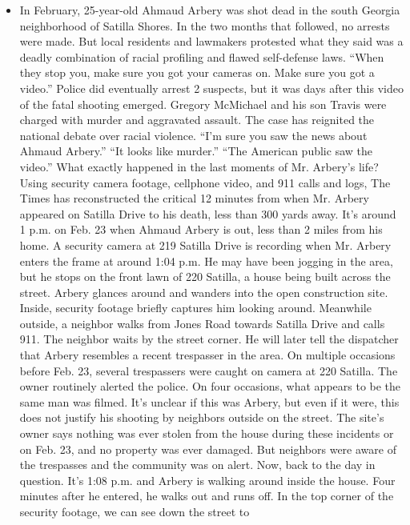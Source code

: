 \begin{itemize}
\tightlist
\item
  In February, 25-year-old Ahmaud Arbery was shot dead in the south
  Georgia neighborhood of Satilla Shores. In the two months that
  followed, no arrests were made. But local residents and lawmakers
  protested what they said was a deadly combination of racial profiling
  and flawed self-defense laws. ``When they stop you, make sure you got
  your cameras on. Make sure you got a video.'' Police did eventually
  arrest 2 suspects, but it was days after this video of the fatal
  shooting emerged. Gregory McMichael and his son Travis were charged
  with murder and aggravated assault. The case has reignited the
  national debate over racial violence. ``I'm sure you saw the news
  about Ahmaud Arbery.'' ``It looks like murder.'' ``The American public
  saw the video.'' What exactly happened in the last moments of Mr.
  Arbery's life? Using security camera footage, cellphone video, and 911
  calls and logs, The Times has reconstructed the critical 12 minutes
  from when Mr. Arbery appeared on Satilla Drive to his death, less than
  300 yards away. It's around 1 p.m. on Feb. 23 when Ahmaud Arbery is
  out, less than 2 miles from his home. A security camera at 219 Satilla
  Drive is recording when Mr. Arbery enters the frame at around 1:04
  p.m. He may have been jogging in the area, but he stops on the front
  lawn of 220 Satilla, a house being built across the street. Arbery
  glances around and wanders into the open construction site. Inside,
  security footage briefly captures him looking around. Meanwhile
  outside, a neighbor walks from Jones Road towards Satilla Drive and
  calls 911. The neighbor waits by the street corner. He will later tell
  the dispatcher that Arbery resembles a recent trespasser in the area.
  On multiple occasions before Feb. 23, several trespassers were caught
  on camera at 220 Satilla. The owner routinely alerted the police. On
  four occasions, what appears to be the same man was filmed. It's
  unclear if this was Arbery, but even if it were, this does not justify
  his shooting by neighbors outside on the street. The site's owner says
  nothing was ever stolen from the house during these incidents or on
  Feb. 23, and no property was ever damaged. But neighbors were aware of
  the trespasses and the community was on alert. Now, back to the day in
  question. It's 1:08 p.m. and Arbery is walking around inside the
  house. Four minutes after he entered, he walks out and runs off. In
  the top corner of the security footage, we can see down the street to

\end{itemize}
